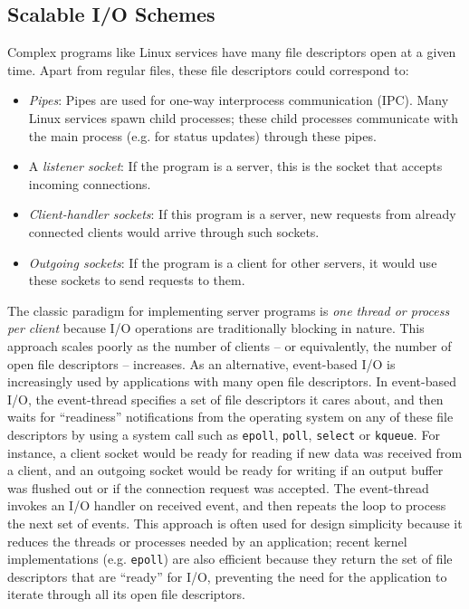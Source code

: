 \subsection{Scalable I/O Schemes} \label{ch3:poll}
 \newline
Complex programs like Linux services have
many file descriptors open at a given time.
Apart from regular files, these file descriptors could correspond to:

\begin{itemize}

\item {\em Pipes}: Pipes are used for
  one-way interprocess communication (IPC).
  Many Linux services spawn child processes;
  these child processes communicate
  with the main process (e.g. for status
  updates) through these pipes.

\item A {\em listener socket}:
  If the program is a server,
  this is the socket that accepts incoming connections.

\item {\em Client-handler sockets}:
  If this program is a server, 
  new requests from already connected clients would arrive through
  such sockets.

\item {\em Outgoing sockets}:
  If the program is a client for other servers,
  it would use these sockets to send requests 
  to them.
\end{itemize}

The classic paradigm for implementing server
programs is {\em one thread or process per client}
because I/O operations are traditionally blocking
in nature. This approach scales poorly as the number
of clients -- or equivalently, the number of open file descriptors -- increases. 
As an alternative, event-based I/O is increasingly used 
by applications with many open file descriptors.
In event-based I/O, the event-thread
specifies a set of file descriptors it cares about,
and then waits for ``readiness'' notifications 
from the operating system on any of
these file descriptors by using a
system call such as \texttt{epoll}, \texttt{poll},
\texttt{select} or \texttt{kqueue}. 
For instance, a client socket would be ready 
for reading if new data was received from a client,
and an outgoing socket would be ready for 
writing if an output buffer was flushed out or if the 
connection request was accepted.
The event-thread invokes an I/O
handler on received event, 
and then repeats the loop to process the next
set of events.
This approach is often used for design simplicity because it
reduces the threads or processes needed by an application; 
recent kernel implementations (e.g. \texttt{epoll}) are also
efficient because they return the set of file descriptors that are ``ready'' for I/O,
preventing the need for the application to iterate through all its open
file descriptors. 

